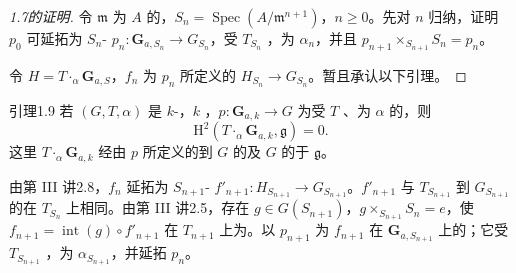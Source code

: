 \begin{proof}[1.7的证明]
令 $\mathfrak m$ 为 $A$ 的，$S_n=\operatorname{Spec}(A/\mathfrak m^{n+1})$，$n\geq0$。先对 $n$ 归纳，证明 $p_0$ 可延拓为 $S_n$- $p_n:\mathbf G_{a,S_n}\to G_{S_n}$，受 $T_{S_n}$ ，为 $\alpha_n$，并且 $p_{n+1}\times_{S_{n+1}}S_n=p_n$。

令 $H=T\mathbin{\cdot}_\alpha\mathbf G_{a,S}$，$f_n$ 为 $p_n$ 所定义的 $H_{S_n}\to G_{S_n}$。暂且承认以下引理。
\end{proof}
\begin{SGAresult}{引理}{1.9}
若 $(G,T,\alpha)$ 是 $k$-，$k$ ，$p:\mathbf G_{a,k}\to G$ 为受 $T$ 、为 $\alpha$ 的，则
\[\mathrm H^2(T\mathbin{\cdot}_\alpha\mathbf G_{a,k},\mathfrak g)=0.\]
这里 $T\mathbin{\cdot}_\alpha\mathbf G_{a,k}$ 经由 $p$ 所定义的到 $G$ 的及 $G$ 的于 $\mathfrak g$。
\end{SGAresult}
由第 III 讲2.8，$f_n$ 延拓为 $S_{n+1}$- $f'_{n+1}:H_{S_{n+1}}\to G_{S_{n+1}}$。$f'_{n+1}$ 与 $T_{S_{n+1}}$ 到 $G_{S_{n+1}}$ 的在 $T_{S_n}$ 上相同。由第 III 讲2.5，存在 $g\in G(S_{n+1})$，$g\times_{S_{n+1}}S_n=e$，使 $f_{n+1}=\operatorname{int}(g)\circ f'_{n+1}$ 在 $T_{n+1}$ 上为。以 $p_{n+1}$ 为 $f_{n+1}$ 在 $\mathbf G_{a,S_{n+1}}$ 上的；它受 $T_{S_{n+1}}$ ，为 $\alpha_{S_{n+1}}$，并延拓 $p_n$。

